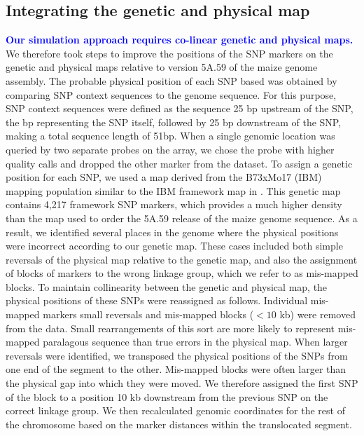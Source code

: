 \documentclass[twocolumn,twoside,letterpaper]{article}
\newcommand{\rev}[1]{\textcolor{blue}{\bf #1}}
\begin{document}
\subsection*{Integrating the genetic and physical map}
\rev{Our simulation approach requires co-linear genetic and physical maps.}
We therefore took steps to improve the positions of the SNP markers on the genetic and physical maps relative to version 5A.59 of the maize genome assembly. 
The probable physical position of each SNP based was obtained by comparing SNP context sequences to the genome sequence. 
For this purpose, SNP context sequences were defined as the sequence 25 bp upstream of the SNP, the bp representing the SNP itself, followed by 25 bp downstream of the SNP, making a total sequence length of 51bp. 
When a single genomic location was queried by two separate probes on the array, we chose the probe with higher quality calls and dropped the other marker from the dataset. 
To assign a genetic position for each SNP, we used a map derived from the B73xMo17 (IBM) mapping population similar to the IBM framework map in \citet{ganal2011a-large}. 
This genetic map contains 4,217 framework SNP markers, which provides a much higher density than the map used to order the 5A.59 release of the maize genome sequence. 
As a result, we identified several places in the genome where the physical positions were incorrect according to our genetic map. 
These cases included both simple reversals of the physical map relative to the genetic map, and also the assignment of blocks of markers to the wrong linkage group, which we refer to as mis-mapped blocks. 
To maintain collinearity between the genetic and physical map, the physical positions of these SNPs were reassigned as follows. 
Individual mis-mapped markers small reversals and mis-mapped blocks ($<10$ kb) were removed from the data. 
Small rearrangements of this sort are more likely to represent mis-mapped paralagous sequence than true errors in the physical map. 
When larger reversals were identified, we transposed the physical positions of the SNPs from one end of the segment to the other. 
Mis-mapped blocks were often larger than the physical gap into which they were moved. 
We therefore assigned the first SNP of the block to a position 10 kb downstream from the previous SNP on the correct linkage group. 
We then recalculated genomic coordinates for the rest of the chromosome based on the marker distances within the translocated segment. 
\end{document}
